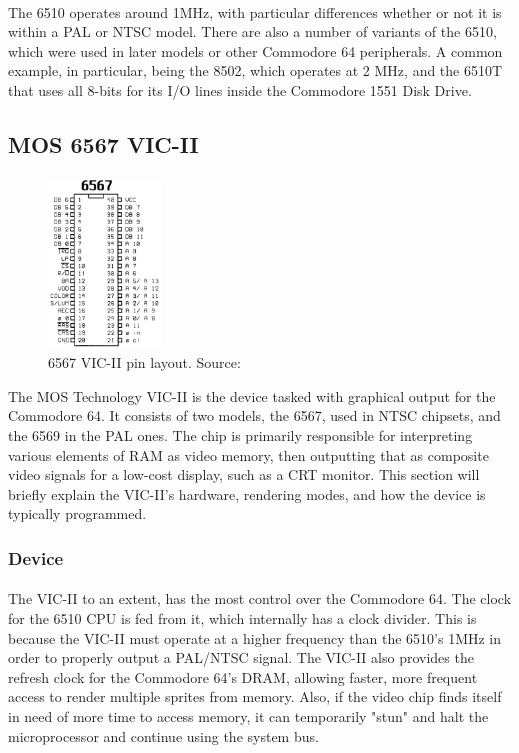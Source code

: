 \documentclass{article}
\begin{document}
\paragraph{}
The 6510 operates around 1MHz, with particular differences whether or not it is within a PAL or NTSC model. There are also a number of variants of the 6510, which were used in later models or other Commodore 64 peripherals. A common example, in particular, being the 8502, which operates at 2 MHz, and the 6510T that uses all 8-bits for its I/O lines inside the Commodore 1551 Disk Drive.

\subsection{MOS 6567 VIC-II}
\paragraph{}
\begin{figure}
\vspace{-20pt}
\begin{center}
\includegraphics[width=3cm]{6567}
\caption{6567 VIC-II pin layout. Source: \cite{c64_tech_details}}
\end{center}
\end{figure}
The MOS Technology VIC-II is the device tasked with graphical output for the Commodore 64. It consists of two models, the 6567, used in NTSC chipsets, and the 6569 in the PAL ones. The chip is primarily responsible for interpreting various elements of RAM as video memory, then outputting that as composite video signals for a low-cost display, such as a CRT monitor. This section will briefly explain the VIC-II's hardware, rendering modes, and how the device is typically programmed.

\subsubsection{Device}
\paragraph{}
The VIC-II to an extent, has the most control over the Commodore 64. The clock for the 6510 CPU is fed from it, which internally has a clock divider. This is because the VIC-II must operate at a higher frequency than the 6510's 1MHz in order to properly output a PAL/NTSC signal. The VIC-II also provides the refresh clock for the Commodore 64's DRAM, allowing faster, more frequent access to render multiple sprites from memory. Also, if the video chip finds itself in need of more time to access memory, it can temporarily "stun" and halt the microprocessor and continue using the system bus. 
\end{document}
